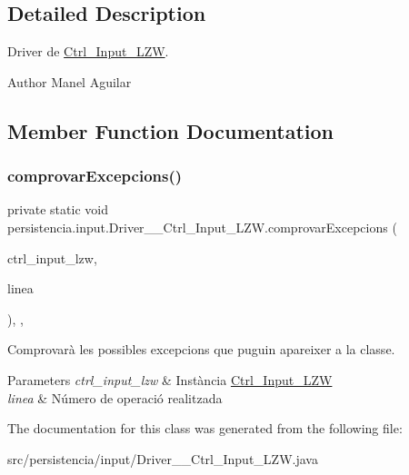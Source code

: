 \subsection{Detailed Description}
Driver de \hyperlink{classpersistencia_1_1input_1_1Ctrl__Input__LZW}{Ctrl\+\_\+\+Input\+\_\+\+L\+ZW}. 

\begin{DoxyAuthor}{Author}
Manel Aguilar 
\end{DoxyAuthor}


\subsection{Member Function Documentation}
\mbox{\label{classpersistencia_1_1input_1_1Driver____Ctrl__Input__LZW_a86e186fca84cfae1f5a019b4853a0902}} 
\subsubsection{\texorpdfstring{comprovar\+Excepcions()}{comprovarExcepcions()}}
{\footnotesize\ttfamily private static void persistencia.\+input.\+Driver\+\_\+\+\_\+\+Ctrl\+\_\+\+Input\+\_\+\+L\+Z\+W.\+comprovar\+Excepcions (\begin{DoxyParamCaption}\item[{\hyperlink{classpersistencia_1_1input_1_1Ctrl__Input__LZW}{Ctrl\+\_\+\+Input\+\_\+\+L\+ZW}}]{ctrl\+\_\+input\+\_\+lzw,  }\item[{String}]{linea }\end{DoxyParamCaption})\hspace{0.3cm}{\ttfamily [inline]}, {\ttfamily [static]}, {\ttfamily [private]}}



Comprovarà les possibles excepcions que puguin apareixer a la classe. 


\begin{DoxyParams}{Parameters}
{\em ctrl\+\_\+input\+\_\+lzw} & Instància \hyperlink{classpersistencia_1_1input_1_1Ctrl__Input__LZW}{Ctrl\+\_\+\+Input\+\_\+\+L\+ZW} \\
\hline
{\em linea} & Número de operació realitzada \\
\hline
\end{DoxyParams}


The documentation for this class was generated from the following file\+:\begin{DoxyCompactItemize}
\item 
src/persistencia/input/Driver\+\_\+\+\_\+\+Ctrl\+\_\+\+Input\+\_\+\+L\+Z\+W.\+java\end{DoxyCompactItemize}
